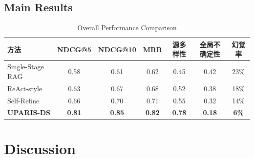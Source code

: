 \documentclass[12pt,a4paper]{article}
\begin{document}

\subsection{Main Results}


\begin{table}[htbp]
\centering
\caption{Overall Performance Comparison}
\begin{tabular}{lcccccc}
\toprule
方法 & NDCG@5 & NDCG@10 & MRR & 源多样性 & 全局不确定性 & 幻觉率\\
\midrule
Single-Stage RAG & 0.58 & 0.61 & 0.62 & 0.45 & 0.42 & 23\%\\
ReAct-style & 0.63 & 0.67 & 0.68 & 0.52 & 0.38 & 18\%\\
Self-Refine & 0.66 & 0.70 & 0.71 & 0.55 & 0.32 & 14\%\\
\textbf{UPARIS-DS} & \textbf{0.81} & \textbf{0.85} & \textbf{0.82} & \textbf{0.78} & \textbf{0.18} & \textbf{6\%}\\
\bottomrule
\end{tabular}
\label{tab:results}
\end{table}



\section{Discussion}
\end{document}
